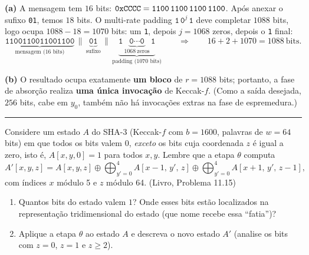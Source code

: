 \documentclass[11pt,a4paper]{article}
\newcommand{\livro}[1]{{\footnotesize\color{black!50}(Livro, Problema #1)}}
\newcommand{\exercicio}[1]{%
    \Needspace{8\baselineskip}%
    \par\vspace{1.2em}
    \noindent
    {\color{black!55}\rule[-0.25em]{3pt}{1.6em}}%
    \hspace{0.6em}{\Large\bfseries Exerc\'{i}cio #1}
    \par\vspace{-0.4em}
    \noindent{\color{black!35}\rule{\textwidth}{0.4pt}}
    \par\vspace{0.35em}
}
\newenvironment{resposta}{%
    \begin{respostabox}
    \color{red!70!black}\sloppy
}{%
    \end{respostabox}
}
\begin{document}
\begin{resposta}
\textbf{(a)} A mensagem tem $16$ bits: $\texttt{0xCCCC} = \texttt{1100\,1100\,1100\,1100}$. Ap\'{o}s anexar o sufixo \texttt{01}, temos $18$ bits. O multi-rate padding $\texttt{1}\,\texttt{0}^{j}\,\texttt{1}$ deve completar $1088$ bits, logo ocupa $1088 - 18 = 1070$ bits: um \texttt{1}, depois $j = 1068$ zeros, depois o \texttt{1} final:
\[
    \underbrace{\texttt{1100110011001100}}_{\text{mensagem (16 bits)}}
    \,\|\,
    \underbrace{\texttt{01}}_{\text{sufixo}}
    \,\|\,
    \underbrace{\texttt{1}\,\underbrace{\texttt{0}\cdots\texttt{0}}_{1068\ \text{zeros}}\,\texttt{1}}_{\text{padding (1070 bits)}}
    \qquad \Rightarrow \qquad 16 + 2 + 1070 = 1088 \ \text{bits}.
\]

\textbf{(b)} O resultado ocupa exatamente \textbf{um bloco} de $r = 1088$ bits; portanto, a fase de absor\c{c}\~{a}o realiza \textbf{uma \'{u}nica invoca\c{c}\~{a}o} de Keccak-$f$. (Como a sa\'{i}da desejada, $256$ bits, cabe em $y_0$, tamb\'{e}m n\~{a}o h\'{a} invoca\c{c}\~{o}es extras na fase de espremedura.)
\end{resposta}

\exercicio{8}
Considere um estado $A$ do SHA-3 (Keccak-$f$ com $b = 1600$, palavras de $w = 64$ bits) em que todos os bits valem $0$, \emph{exceto} os bits cuja coordenada $z$ \'{e} igual a zero, isto \'{e}, $A[x,y,0] = 1$ para todos $x, y$. Lembre que a etapa $\theta$ computa
\[
    A'[x,y,z] = A[x,y,z] \oplus \bigoplus_{y'=0}^{4} A[x{-}1,\,y',\,z] \oplus \bigoplus_{y'=0}^{4} A[x{+}1,\,y',\,z{-}1],
\]
com \'{i}ndices $x$ m\'{o}dulo 5 e $z$ m\'{o}dulo 64. \livro{11.15}
\begin{enumerate}[label=(\alph*)]
    \item Quantos bits do estado valem $1$? Onde esses bits est\~{a}o localizados na representa\c{c}\~{a}o tridimensional do estado (que nome recebe essa ``fatia'')?
    \item Aplique a etapa $\theta$ ao estado $A$ e descreva o novo estado $A'$ (analise os bits com $z = 0$, $z = 1$ e $z \ge 2$).
\end{enumerate}
\end{document}
